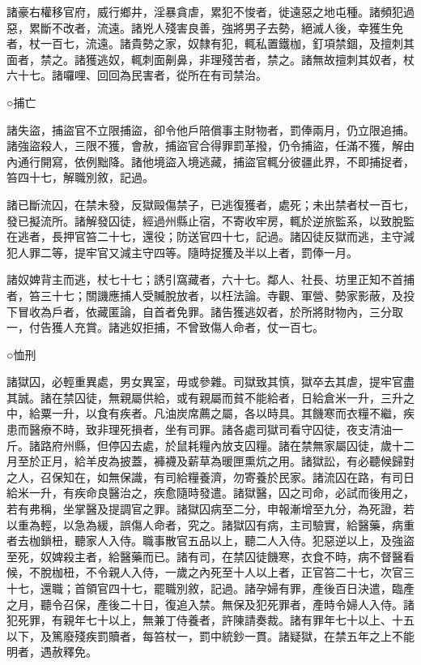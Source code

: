 \begin{pinyinscope}
 諸豪右權移官府，威行鄉井，淫暴貪虐，累犯不悛者，徙遠惡之地屯種。諸頻犯過惡，累斷不改者，流遠。諸兇人殘害良善，強將男子去勢，絕滅人後，幸獲生免者，杖一百七，流遠。諸貴勢之家，奴隸有犯，輒私置鐵枷，釘項禁錮，及擅刺其面者，禁之。諸獲逃奴，輒刺面劓鼻，非理殘苦者，禁之。諸無故擅刺其奴者，杖六十七。諸囉哩、回回為民害者，從所在有司禁治。



 ○捕亡



 諸失盜，捕盜官不立限捕盜，卻令他戶陪償事主財物者，罰俸兩月，仍立限追捕。諸強盜殺人，三限不獲，會赦，捕盜官合得罪罰革撥，仍令捕盜，任滿不獲，解由內通行開寫，依例黜降。諸他境盜入境逃藏，捕盜官輒分彼疆此界，不即捕捉者，笞四十七，解職別敘，記過。



 諸已斷流囚，在禁未發，反獄毆傷禁子，已逃復獲者，處死；未出禁者杖一百七，發已擬流所。諸解發囚徒，經過州縣止宿，不寄收牢房，輒於逆旅監系，以致脫監在逃者，長押官笞二十七，還役；防送官四十七，記過。諸囚徒反獄而逃，主守減犯人罪二等，提牢官又減主守四等。隨時捉獲及半以上者，罰俸一月。



 諸奴婢背主而逃，杖七十七；誘引窩藏者，六十七。鄰人、社長、坊里正知不首捕者，笞三十七；關譏應捕人受贓脫放者，以枉法論。寺觀、軍營、勢家影蔽，及投下冒收為戶者，依藏匿論，自首者免罪。諸告獲逃奴者，於所將財物內，三分取一，付告獲人充賞。諸逃奴拒捕，不曾致傷人命者，仗一百七。



 ○恤刑



 諸獄囚，必輕重異處，男女異室，毋或參雜。司獄致其慎，獄卒去其虐，提牢官盡其誠。諸在禁囚徒，無親屬供給，或有親屬而貧不能給者，日給倉米一升，三升之中，給粟一升，以食有疾者。凡油炭席薦之屬，各以時具。其饑寒而衣糧不繼，疾患而醫療不時，致非理死損者，坐有司罪。諸各處司獄司看守囚徒，夜支清油一斤。諸路府州縣，但停囚去處，於鼠耗糧內放支囚糧。諸在禁無家屬囚徒，歲十二月至於正月，給羊皮為披蓋，褲襪及薪草為暖匣熏炕之用。諸獄訟，有必聽候歸對之人，召保知在，如無保識，有司給糧養濟，勿寄養於民家。諸流囚在路，有司日給米一升，有疾命良醫治之，疾愈隨時發遣。諸獄醫，囚之司命，必試而後用之，若有弗稱，坐掌醫及提調官之罪。諸獄囚病至二分，申報漸增至九分，為死證，若以重為輕，以急為緩，誤傷人命者，究之。諸獄囚有病，主司驗實，給醫藥，病重者去枷鎖杻，聽家人入侍。職事散官五品以上，聽二人入侍。犯惡逆以上，及強盜至死，奴婢殺主者，給醫藥而已。諸有司，在禁囚徒饑寒，衣食不時，病不督醫看候，不脫枷杻，不令親人入侍，一歲之內死至十人以上者，正官笞二十七，次官三十七，還職；首領官四十七，罷職別敘，記過。諸孕婦有罪，產後百日決遣，臨產之月，聽令召保，產後二十日，復追入禁。無保及犯死罪者，產時令婦人入侍。諸犯死罪，有親年七十以上，無兼丁侍養者，許陳請奏裁。諸有罪年七十以上、十五以下，及篤廢殘疾罰贖者，每笞杖一，罰中統鈔一貫。諸疑獄，在禁五年之上不能明者，遇赦釋免。




\end{pinyinscope}
